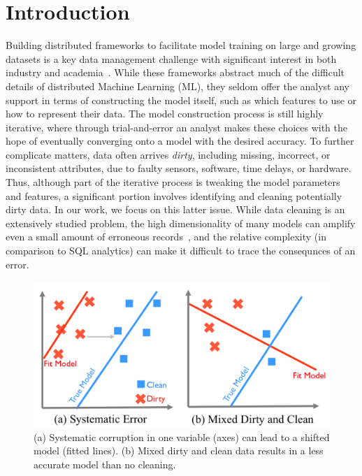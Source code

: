 \section{Introduction}
Building distributed frameworks to facilitate model training on large and growing datasets is a key data management challenge with significant interest in both industry and academia~\cite{bdas, alexandrov2014stratosphere, crotty2014tupleware, tensor}.
While these frameworks abstract much of the difficult details of distributed Machine Learning (ML), they seldom offer the analyst any support in terms of constructing the model itself, such as which features to use or how to represent their data.
The model construction process is still highly iterative, where through trial-and-error an analyst makes these choices with the hope of eventually converging onto a model with the desired accuracy.
To further complicate matters, data often arrives \emph{dirty}, including missing, incorrect, or inconsistent attributes, due to faulty sensors, software, time delays, or hardware.
Thus, although part of the iterative process is tweaking the model parameters and features, a significant portion involves identifying and cleaning potentially dirty data.  
In our work, we focus on this latter issue. 
While data cleaning is an extensively studied problem, the high dimensionality of many models can amplify even a small amount of erroneous records~\cite{xiaofeature}, and the relative complexity (in comparison to SQL analytics) can make it difficult to trace the consequnces of an error.

\begin{figure}[t]
\centering
 \includegraphics[width=\columnwidth]{figs/update-arch.png}
 \caption{(a) Systematic corruption in one variable (axes) can lead to a shifted model (fitted lines). 
 (b) Mixed dirty and clean data results in a less accurate model than no cleaning.\label{update-arch1}}\vspace{-1em}
\end{figure}

